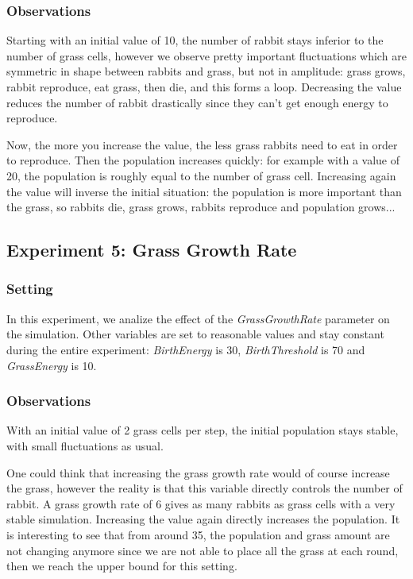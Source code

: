 \documentclass[11pt]{article}
\begin{document}
\subsubsection{Observations}
Starting with an initial value of 10, the number of rabbit stays inferior to the number of grass cells, however we observe pretty important fluctuations which are symmetric in shape between rabbits and grass, but not in amplitude: grass grows, rabbit reproduce, eat grass, then die, and this forms a loop. Decreasing the value reduces the number of rabbit drastically since they can't get enough energy to reproduce. 

Now, the more you increase the value, the less grass rabbits need to eat in order to reproduce. Then the population increases quickly: for example with a value of 20, the population is roughly equal to the number of grass cell. Increasing again the value will inverse the initial situation: the population is more important than the grass, so rabbits die, grass grows, rabbits reproduce and population grows...

\subsection{Experiment 5: Grass Growth Rate}

\subsubsection{Setting}
In this experiment, we analize the effect of the \textit{GrassGrowthRate} parameter on the simulation. Other variables are set to reasonable values and stay constant during the entire experiment: \textit{BirthEnergy} is 30, \textit{BirthThreshold} is 70 and \textit{GrassEnergy} is 10.


\subsubsection{Observations}
With an initial value of 2 grass cells per step, the initial population stays stable, with small fluctuations as usual.

One could think that increasing the grass growth rate would of course increase the grass, however the reality is that this variable directly controls the number of rabbit. A grass growth rate of 6 gives as many rabbits as grass cells with a very stable simulation. Increasing the value again directly increases the population. It is interesting to see that from around 35, the population and grass amount are not changing anymore since we are not able to place all the grass at each round, then we reach the upper bound for this setting.
\end{document}
